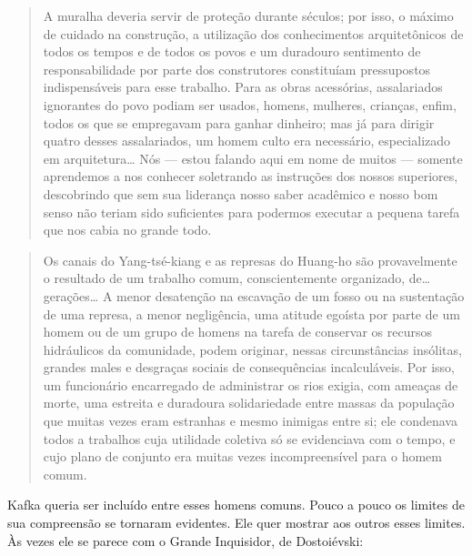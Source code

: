 \begin{quote}
A muralha deveria servir de proteção durante séculos; por isso, o
 máximo de cuidado na construção, a utilização dos conhecimentos
 arquitetônicos de todos os tempos e de todos os povos e um duradouro
 sentimento de responsabilidade por parte dos construtores constituíam
 pressupostos indispensáveis para esse trabalho. Para as obras acessórias,
 assalariados ignorantes do povo podiam ser usados, homens, mulheres,
 crianças, enfim, todos os que se empregavam para ganhar dinheiro; mas já
 para dirigir quatro desses assalariados, um homem culto era necessário,
 especializado em arquitetura\ldots{} Nós --- estou falando aqui em nome de
 muitos --- somente aprendemos a nos conhecer soletrando as instruções
 dos nossos superiores, descobrindo que sem sua liderança nosso saber
 acadêmico e nosso bom senso não teriam sido suficientes para podermos
 executar a pequena tarefa que nos cabia no grande todo. 
\end{quote}


\begin{quote}
Os canais do
Yang-tsé-kiang e as represas do Huang-ho são provavelmente o resultado
de um trabalho comum, conscientemente organizado, de\ldots{} gerações\ldots{} A
menor desatenção na escavação de um fosso ou na sustentação de uma
represa, a menor negligência, uma atitude egoísta por parte de um homem
ou de um grupo de homens na tarefa de conservar os recursos hidráulicos
da comunidade, podem originar, nessas circunstâncias insólitas, grandes
males e desgraças sociais de consequências incalculáveis. Por isso, um
funcionário encarregado de administrar os rios exigia, com ameaças de
morte, uma estreita e duradoura solidariedade entre massas da população
que muitas vezes eram estranhas e mesmo inimigas entre si; ele condenava
todos a trabalhos cuja utilidade coletiva só se evidenciava com o tempo,
e cujo plano de conjunto era muitas vezes incompreensível para o homem
comum.
\end{quote}

Kafka queria ser incluído entre esses homens comuns. Pouco a pouco os
limites de sua compreensão se tornaram evidentes. Ele quer mostrar aos
outros esses limites. Às vezes ele se parece com o Grande Inquisidor, de
Dostoiévski: 

